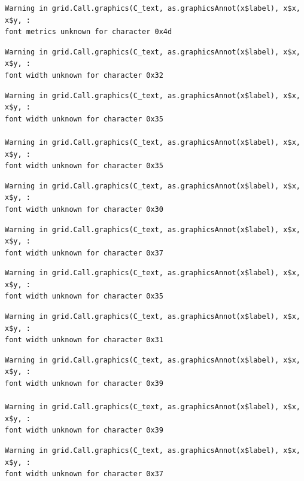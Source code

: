 \documentclass[
  letterpaper,
  DIV=11,
  numbers=noendperiod]{scrreprt}
\begin{document}
\begin{verbatim}
Warning in grid.Call.graphics(C_text, as.graphicsAnnot(x$label), x$x, x$y, :
font metrics unknown for character 0x4d
\end{verbatim}

\begin{verbatim}
Warning in grid.Call.graphics(C_text, as.graphicsAnnot(x$label), x$x, x$y, :
font width unknown for character 0x32
\end{verbatim}

\begin{verbatim}
Warning in grid.Call.graphics(C_text, as.graphicsAnnot(x$label), x$x, x$y, :
font width unknown for character 0x35

Warning in grid.Call.graphics(C_text, as.graphicsAnnot(x$label), x$x, x$y, :
font width unknown for character 0x35
\end{verbatim}

\begin{verbatim}
Warning in grid.Call.graphics(C_text, as.graphicsAnnot(x$label), x$x, x$y, :
font width unknown for character 0x30
\end{verbatim}

\begin{verbatim}
Warning in grid.Call.graphics(C_text, as.graphicsAnnot(x$label), x$x, x$y, :
font width unknown for character 0x37
\end{verbatim}

\begin{verbatim}
Warning in grid.Call.graphics(C_text, as.graphicsAnnot(x$label), x$x, x$y, :
font width unknown for character 0x35
\end{verbatim}

\begin{verbatim}
Warning in grid.Call.graphics(C_text, as.graphicsAnnot(x$label), x$x, x$y, :
font width unknown for character 0x31
\end{verbatim}

\begin{verbatim}
Warning in grid.Call.graphics(C_text, as.graphicsAnnot(x$label), x$x, x$y, :
font width unknown for character 0x39

Warning in grid.Call.graphics(C_text, as.graphicsAnnot(x$label), x$x, x$y, :
font width unknown for character 0x39
\end{verbatim}

\begin{verbatim}
Warning in grid.Call.graphics(C_text, as.graphicsAnnot(x$label), x$x, x$y, :
font width unknown for character 0x37
\end{verbatim}
\end{document}
